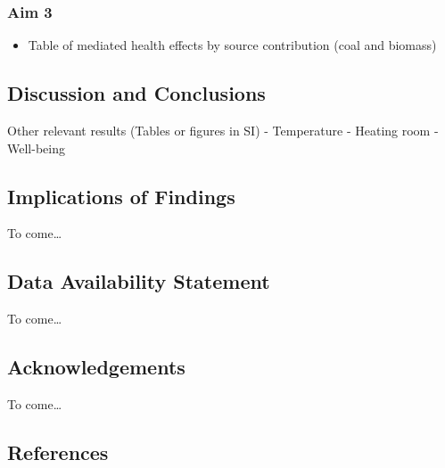 \documentclass[
  letterpaper,
  DIV=11,
  numbers=noendperiod]{scrartcl}
\providecommand{\tightlist}{%
  \setlength{\itemsep}{0pt}\setlength{\parskip}{0pt}}\usepackage{longtable,booktabs,array}
\begin{document}
\hypertarget{aim-3}{%
\subsubsection{Aim 3}\label{aim-3}}

\begin{itemize}
\tightlist
\item
  Table of mediated health effects by source contribution (coal and
  biomass)
\end{itemize}

\hypertarget{discussion-and-conclusions}{%
\subsection{Discussion and
Conclusions}\label{discussion-and-conclusions}}

Other relevant results (Tables or figures in SI) - Temperature - Heating
room - Well-being

\hypertarget{implications-of-findings}{%
\subsection{Implications of Findings}\label{implications-of-findings}}

To come\ldots{}

\hypertarget{data-availability-statement}{%
\subsection{Data Availability
Statement}\label{data-availability-statement}}

To come\ldots{}

\hypertarget{acknowledgements}{%
\subsection{Acknowledgements}\label{acknowledgements}}

To come\ldots{}

\hypertarget{references}{%
\subsection{References}\label{references}}
\end{document}
